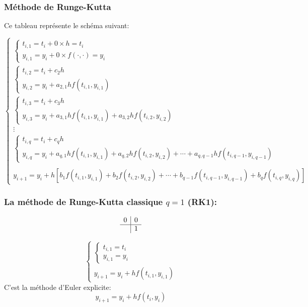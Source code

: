 \documentclass{beamer}
\begin{document}
\begin{frame}
 \frametitle{Méthode de Runge-Kutta}

 Ce tableau représente le schéma suivant:
 
 \[\left\{\begin{array}{l}
 \left\{\begin{array}{l}
 t_{i,1}=t_{i}+0\times h=t_i\\
 y_{i,1}=y_{i}+0\times f(\cdot,\cdot)=y_i
\end{array}\right.\\
\left\{\begin{array}{l}
 t_{i,2}=t_{i}+c_2 h\\
 y_{i,2}=y_{i}+a_{2,1}h f(t_{i,1},y_{i,1})
\end{array}\right.\\
\left\{\begin{array}{l}
 t_{i,3}=t_{i}+c_3 h\\
 y_{i,3}=y_{i}+a_{3,1} hf(t_{i,1},y_{i,1})+a_{3,2}h f(t_{i,2},y_{i,2})
\end{array}\right.\\
\vdots\\
\left\{\begin{array}{l}
 t_{i,q}=t_{i}+c_q h\\
 y_{i,q}=y_{i}+a_{q,1}h f(t_{i,1},y_{i,1})+a_{q,2} hf(t_{i,2},y_{i,2})+\cdots+a_{q,q-1} hf(t_{i,q-1},y_{i,q-1})
\end{array}\right.\\
\\
 y_{i+1}=y_{i}+h \left[b_{1} f(t_{i,1},y_{i,1})+b_2 f(t_{i,2},y_{i,2})+\cdots+b_{q-1} f(t_{i,q-1},y_{i,q-1})+b_{q} f(t_{i,q},y_{i,q})\right]
\end{array}\right.\]
\end{frame}        
 \begin{frame}
 \frametitle{La méthode de Runge-Kutta classique  $q=1$ (RK1):}

\[\begin{array}{c|c}
0&0\\
 \hline
&1
\end{array}\]

\[\left\{\begin{array}{l}
 \left\{\begin{array}{l}
 t_{i,1}=t_{i}\\
 y_{i,1}=y_{i}
\end{array}\right.\\

 y_{i+1}=y_{i}+h f(t_{i,1},y_{i,1}) 
\end{array}\right.\]
C'est la méthode d'Euler explicite: 
\[y_{i+1}=y_{i}+h f(t_{i},y_{i}) \]
\end{frame}         
\end{document}
